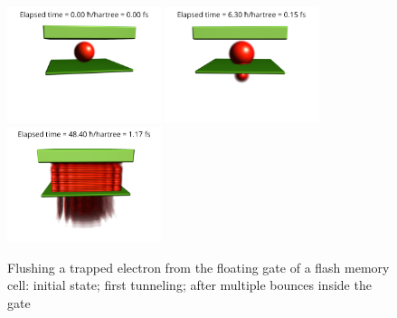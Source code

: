 \begin{figure}[hbtp!]
	\begin{center}
		\includegraphics[width=0.4\textwidth]{figures/flash_memory_01.png}
		\includegraphics[width=0.4\textwidth]{figures/flash_memory_02.png}
		\includegraphics[width=0.4\textwidth]{figures/flash_memory_03.png}
		\caption{Flushing a trapped electron from the floating gate of a flash memory cell: initial state; first tunneling; after multiple bounces inside the gate}
		\label{fig:flash_memory_ray_traced}
	\end{center}
\end{figure}


\FloatBarrier